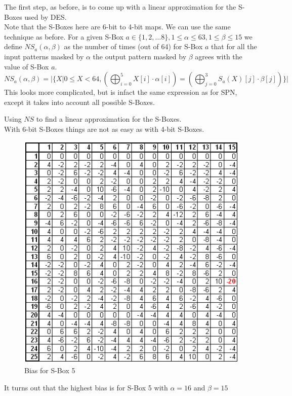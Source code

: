 \documentclass[9pt]{beamer}
\begin{document}
\begin{frame}
The first step, as before, is to come up with a linear approximation for the S-Boxes used by DES.\\
\vspace{5mm}
Note that the S-Boxes here are 6-bit to 4-bit maps. We can use the same technique as before. For a given S-Box $a \in \{1, 2, \dots 8\}, 1 \leq \alpha \leq 63, 1 \leq \beta \leq 15$ we define $NS_{a}(\alpha, \beta)$ as the number of times (out of 64) for S-Box $a$ that for all the input patterns masked by $\alpha$ the output pattern masked by $\beta$ agrees with the value of S-Box $a$.
\[ NS_{a}(\alpha, \beta) = | \{ X | 0 \leq X < 64, ( \bigoplus_{i=0}^5 X[i]\cdot\alpha[i]) = (\bigoplus_{j=0}^3 S_a(X)[j] \cdot \beta[j])\} | \]
This looks more complicated, but is infact the same expression as for SPN, except it takes into account all possible S-Boxes.
\end{frame}

\begin{frame}
Using $NS$ to find a linear approximation for the S-Boxes.\\
\vspace{5mm}
With 6-bit S-Boxes things are not as easy as with 4-bit S-Boxes.
\begin{figure}
\includegraphics[totalheight=0.5\textheight]{NS_S5.PNG}
\caption{Bias for S-Box 5 }
\end{figure}
It turns out that the highest bias is for S-Box 5 with $\alpha = 16$ and $\beta = 15$
\end{frame}
\end{document}
